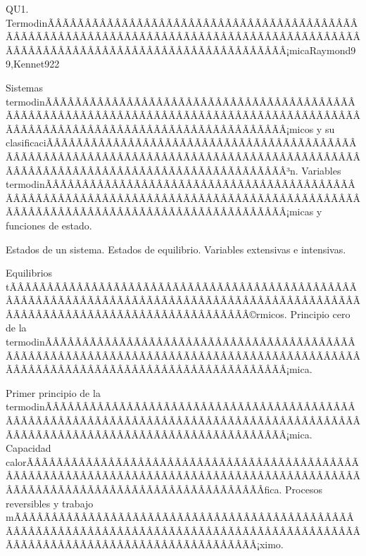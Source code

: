 \begin{sumilla}
\begin{unit}{QU1. TermodinÃÂÃÂÃÂÃÂÃÂÃÂÃÂÃÂÃÂÃÂÃÂÃÂÃÂÃÂÃÂÃÂÃÂÃÂÃÂÃÂÃÂÃÂÃÂÃÂÃÂÃÂÃÂÃÂÃÂÃÂÃÂÃÂÃÂÃÂÃÂÃÂÃÂÃÂÃÂÃÂÃÂÃÂÃÂÃÂÃÂÃÂÃÂÃÂÃÂÃÂÃÂÃÂÃÂÃÂÃÂÃÂÃÂÃÂÃÂÃÂÃÂÃÂÃÂÃÂ¡mica}{Raymond99,Kennet92}{2}
\begin{topicos}
      \item Sistemas termodinÃÂÃÂÃÂÃÂÃÂÃÂÃÂÃÂÃÂÃÂÃÂÃÂÃÂÃÂÃÂÃÂÃÂÃÂÃÂÃÂÃÂÃÂÃÂÃÂÃÂÃÂÃÂÃÂÃÂÃÂÃÂÃÂÃÂÃÂÃÂÃÂÃÂÃÂÃÂÃÂÃÂÃÂÃÂÃÂÃÂÃÂÃÂÃÂÃÂÃÂÃÂÃÂÃÂÃÂÃÂÃÂÃÂÃÂÃÂÃÂÃÂÃÂÃÂÃÂ¡micos y su clasificaciÃÂÃÂÃÂÃÂÃÂÃÂÃÂÃÂÃÂÃÂÃÂÃÂÃÂÃÂÃÂÃÂÃÂÃÂÃÂÃÂÃÂÃÂÃÂÃÂÃÂÃÂÃÂÃÂÃÂÃÂÃÂÃÂÃÂÃÂÃÂÃÂÃÂÃÂÃÂÃÂÃÂÃÂÃÂÃÂÃÂÃÂÃÂÃÂÃÂÃÂÃÂÃÂÃÂÃÂÃÂÃÂÃÂÃÂÃÂÃÂÃÂÃÂÃÂÃÂ³n. Variables termodinÃÂÃÂÃÂÃÂÃÂÃÂÃÂÃÂÃÂÃÂÃÂÃÂÃÂÃÂÃÂÃÂÃÂÃÂÃÂÃÂÃÂÃÂÃÂÃÂÃÂÃÂÃÂÃÂÃÂÃÂÃÂÃÂÃÂÃÂÃÂÃÂÃÂÃÂÃÂÃÂÃÂÃÂÃÂÃÂÃÂÃÂÃÂÃÂÃÂÃÂÃÂÃÂÃÂÃÂÃÂÃÂÃÂÃÂÃÂÃÂÃÂÃÂÃÂÃÂ¡micas y funciones de estado.
      \item Estados de un sistema. Estados de equilibrio. Variables extensivas e intensivas.
      \item Equilibrios tÃÂÃÂÃÂÃÂÃÂÃÂÃÂÃÂÃÂÃÂÃÂÃÂÃÂÃÂÃÂÃÂÃÂÃÂÃÂÃÂÃÂÃÂÃÂÃÂÃÂÃÂÃÂÃÂÃÂÃÂÃÂÃÂÃÂÃÂÃÂÃÂÃÂÃÂÃÂÃÂÃÂÃÂÃÂÃÂÃÂÃÂÃÂÃÂÃÂÃÂÃÂÃÂÃÂÃÂÃÂÃÂÃÂÃÂÃÂÃÂÃÂÃÂÃÂÃÂ©rmicos. Principio cero de la termodinÃÂÃÂÃÂÃÂÃÂÃÂÃÂÃÂÃÂÃÂÃÂÃÂÃÂÃÂÃÂÃÂÃÂÃÂÃÂÃÂÃÂÃÂÃÂÃÂÃÂÃÂÃÂÃÂÃÂÃÂÃÂÃÂÃÂÃÂÃÂÃÂÃÂÃÂÃÂÃÂÃÂÃÂÃÂÃÂÃÂÃÂÃÂÃÂÃÂÃÂÃÂÃÂÃÂÃÂÃÂÃÂÃÂÃÂÃÂÃÂÃÂÃÂÃÂÃÂ¡mica.
      \item Primer principio de la termodinÃÂÃÂÃÂÃÂÃÂÃÂÃÂÃÂÃÂÃÂÃÂÃÂÃÂÃÂÃÂÃÂÃÂÃÂÃÂÃÂÃÂÃÂÃÂÃÂÃÂÃÂÃÂÃÂÃÂÃÂÃÂÃÂÃÂÃÂÃÂÃÂÃÂÃÂÃÂÃÂÃÂÃÂÃÂÃÂÃÂÃÂÃÂÃÂÃÂÃÂÃÂÃÂÃÂÃÂÃÂÃÂÃÂÃÂÃÂÃÂÃÂÃÂÃÂÃÂ¡mica. Capacidad calorÃÂÃÂÃÂÃÂÃÂÃÂÃÂÃÂÃÂÃÂÃÂÃÂÃÂÃÂÃÂÃÂÃÂÃÂÃÂÃÂÃÂÃÂÃÂÃÂÃÂÃÂÃÂÃÂÃÂÃÂÃÂÃÂÃÂÃÂÃÂÃÂÃÂÃÂÃÂÃÂÃÂÃÂÃÂÃÂÃÂÃÂÃÂÃÂÃÂÃÂÃÂÃÂÃÂÃÂÃÂÃÂÃÂÃÂÃÂÃÂÃÂÃÂÃÂÃÂ­fica. Procesos reversibles y trabajo mÃÂÃÂÃÂÃÂÃÂÃÂÃÂÃÂÃÂÃÂÃÂÃÂÃÂÃÂÃÂÃÂÃÂÃÂÃÂÃÂÃÂÃÂÃÂÃÂÃÂÃÂÃÂÃÂÃÂÃÂÃÂÃÂÃÂÃÂÃÂÃÂÃÂÃÂÃÂÃÂÃÂÃÂÃÂÃÂÃÂÃÂÃÂÃÂÃÂÃÂÃÂÃÂÃÂÃÂÃÂÃÂÃÂÃÂÃÂÃÂÃÂÃÂÃÂÃÂ¡ximo.

\end{topicos}
\end{unit}
\end{sumilla}
